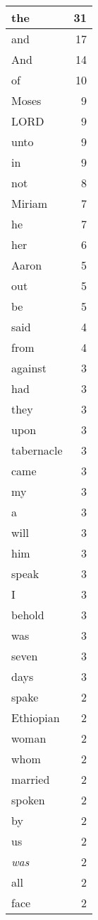 \begin{center}
\begin{longtable}{l|r}
\hline \hline
\endlastfoot
the & 31 \\ \hline
and & 17 \\ \hline
And & 14 \\ \hline
of & 10 \\ \hline
Moses & 9 \\ \hline
LORD & 9 \\ \hline
unto & 9 \\ \hline
in & 9 \\ \hline
not & 8 \\ \hline
Miriam & 7 \\ \hline
he & 7 \\ \hline
her & 6 \\ \hline
Aaron & 5 \\ \hline
out & 5 \\ \hline
be & 5 \\ \hline
said & 4 \\ \hline
from & 4 \\ \hline
against & 3 \\ \hline
had & 3 \\ \hline
they & 3 \\ \hline
upon & 3 \\ \hline
tabernacle & 3 \\ \hline
came & 3 \\ \hline
my & 3 \\ \hline
a & 3 \\ \hline
will & 3 \\ \hline
him & 3 \\ \hline
speak & 3 \\ \hline
I & 3 \\ \hline
behold & 3 \\ \hline
was & 3 \\ \hline
seven & 3 \\ \hline
days & 3 \\ \hline
spake & 2 \\ \hline
Ethiopian & 2 \\ \hline
woman & 2 \\ \hline
whom & 2 \\ \hline
married & 2 \\ \hline
spoken & 2 \\ \hline
by & 2 \\ \hline
us & 2 \\ \hline
\emph{was} & 2 \\ \hline
all & 2 \\ \hline
face & 2 \\ \hline

\end{longtable}
\end{center}
